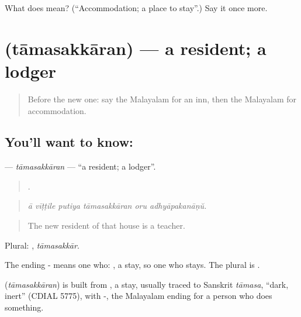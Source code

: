 \begin{tcolorbox}[breakable,colback=teal!4,colframe=teal!35!black,title={Before you move on}]
What does  mean? (\textquotedblleft{}Accommodation; a place to stay\textquotedblright{}.) Say it once more.
\end{tcolorbox}
\section[\texorpdfstring{\ml{താമസക്കാരൻ} (tāmasakkāran)}{താമസക്കാരൻ (tāmasakkāran)}]{ (tāmasakkāran) — a resident; a lodger}

\label{lesson:ML-C481-tamasakkaran}



\begin{quote}
Before the new one: say the Malayalam for an inn, then the Malayalam for accommodation.
\end{quote}

\subsection*{You'll want to know: }
\textbf{} — \emph{tāmasakkāran} — \textquotedblleft{}a resident; a lodger\textquotedblright{}.

\begin{quote}
     .
\end{quote}

\begin{quote}
\emph{ā vīṭṭile putiya tāmasakkāran oru adhyāpakanāṇŭ.}
\end{quote}

\begin{quote}
The new resident of that house is a teacher.
\end{quote}

Plural: , \emph{tāmasakkār}.

The ending - means one who: , a stay, so one who stays. The plural is .

\begin{cousinweb}
\textbf{} (\emph{tāmasakkāran}) is built from , a stay, usually traced to Sanskrit \emph{tāmasa}, \textquotedblleft{}dark, inert\textquotedblright{} (CDIAL 5775), with -, the Malayalam ending for a person who does something.
\end{cousinweb}

